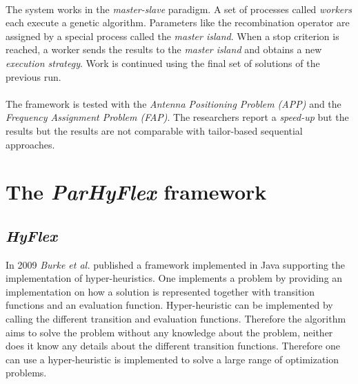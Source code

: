 \documentclass[a4paper,10pt]{article}
\newcommand{\seclab}[1]{\label{sec:#1}}
\theoremstyle{definition}
\begin{document}
\paragraph{}
The system works in the \emph{master-slave} paradigm. A set of processes called \emph{workers} each execute a genetic algorithm. Parameters like the recombination operator are assigned by a special process called the \emph{master island}. When a stop criterion is reached, a worker sends the results to the \emph{master island} and obtains a new \emph{execution strategy}. Work is continued using the final set of solutions of the previous run.%

\paragraph{}
The framework is tested with the \emph{Antenna Positioning Problem (APP)}\cite{} and the \emph{Frequency Assignment Problem (FAP)}\cite{}. The researchers report a \emph{speed-up} but the results but the results are not comparable with tailor-based sequential approaches.



\section{The \emph{ParHyFlex} framework}
\seclab{parhyflex}

\subsection{\emph{HyFlex}}
In 2009 \emph{Burke et al.}\cite{} published a framework implemented in Java supporting the implementation of hyper-heuristics. One implements a problem by providing an implementation on how a solution is represented together with transition functions and an evaluation function. Hyper-heuristic can be implemented by calling the different transition and evaluation functions. Therefore the algorithm aims to solve the problem without any knowledge about the problem, neither does it know any details about the different transition functions. Therefore one can use a hyper-heuristic is implemented to solve a large range of optimization problems.
\end{document}
